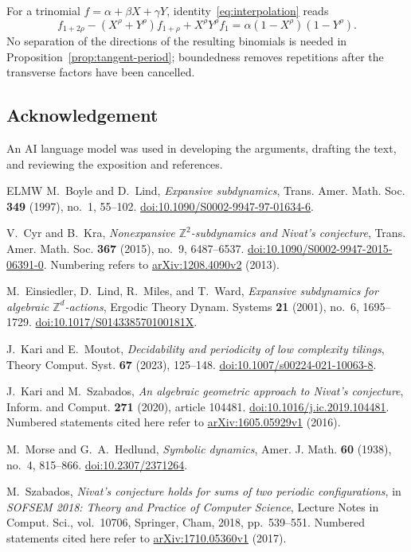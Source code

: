 \documentclass[11pt,a4paper,reqno]{amsart}
\theoremstyle{remark}
\numberwithin{equation}{section}
\begin{document}
For a trinomial $f=\alpha+\beta X+\gamma Y$, identity~\eqref{eq:interpolation} reads
\[
 f_{1+2\rho}-(X^\rho+Y^\rho)f_{1+\rho}+X^\rho Y^\rho f_1
 =\alpha(1-X^\rho)(1-Y^\rho).
\]
No separation of the directions of the resulting binomials is needed in Proposition~\ref{prop:tangent-period}; boundedness removes repetitions after the transverse factors have been cancelled.

\subsection*{Acknowledgement}
An AI language model was used in developing the arguments, drafting the text, and reviewing the exposition and references.

\begin{thebibliography}{ELMW}
M.~Boyle and D.~Lind,
\emph{Expansive subdynamics},
Trans. Amer. Math. Soc. \textbf{349} (1997), no.~1, 55--102.
\href{https://doi.org/10.1090/S0002-9947-97-01634-6}{doi:10.1090/S0002-9947-97-01634-6}.

V.~Cyr and B.~Kra,
\emph{Nonexpansive $\mathbb Z^2$-subdynamics and Nivat's conjecture},
Trans. Amer. Math. Soc. \textbf{367} (2015), no.~9, 6487--6537.
\href{https://doi.org/10.1090/S0002-9947-2015-06391-0}{doi:10.1090/S0002-9947-2015-06391-0}.
Numbering refers to \href{https://arxiv.org/abs/1208.4090v2}{arXiv:1208.4090v2} (2013).

M.~Einsiedler, D.~Lind, R.~Miles, and T.~Ward,
\emph{Expansive subdynamics for algebraic $\mathbb Z^d$-actions},
Ergodic Theory Dynam. Systems \textbf{21} (2001), no.~6, 1695--1729.
\href{https://doi.org/10.1017/S014338570100181X}{doi:10.1017/S014338570100181X}.

J.~Kari and E.~Moutot,
\emph{Decidability and periodicity of low complexity tilings},
Theory Comput. Syst. \textbf{67} (2023), 125--148.
\href{https://doi.org/10.1007/s00224-021-10063-8}{doi:10.1007/s00224-021-10063-8}.

J.~Kari and M.~Szabados,
\emph{An algebraic geometric approach to Nivat's conjecture},
Inform. and Comput. \textbf{271} (2020), article 104481.
\href{https://doi.org/10.1016/j.ic.2019.104481}{doi:10.1016/j.ic.2019.104481}.
Numbered statements cited here refer to
\href{https://arxiv.org/abs/1605.05929v1}{arXiv:1605.05929v1} (2016).

M.~Morse and G.~A.~Hedlund,
\emph{Symbolic dynamics},
Amer. J. Math. \textbf{60} (1938), no.~4, 815--866.
\href{https://doi.org/10.2307/2371264}{doi:10.2307/2371264}.

M.~Szabados,
\emph{Nivat's conjecture holds for sums of two periodic configurations},
in \emph{SOFSEM 2018: Theory and Practice of Computer Science},
Lecture Notes in Comput. Sci., vol.~10706, Springer, Cham, 2018, pp.~539--551.
Numbered statements cited here refer to
\href{https://arxiv.org/abs/1710.05360v1}{arXiv:1710.05360v1} (2017).
\end{thebibliography}
\end{document}
